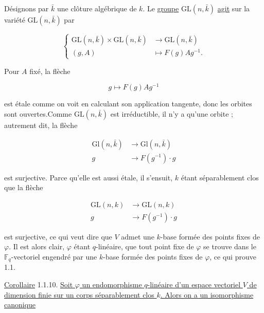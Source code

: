 Désignons par $\bar k$ une clôture algébrique de $k$. Le
\underline{groupe} $\mathrm{GL}(n,\bar k)$ \underline{agit} sur la variété
$\mathrm{GL}(n,\bar k)$ par

\begin{equation}\tag{1.1.6}
\left\{
\begin{aligned}
\mathrm{GL}(n,\bar k)\times\mathrm{GL}(n,\bar k)
&\longrightarrow\mathrm{GL}(n,\bar k)\\
(g,A)&\longmapsto F(g)Ag^{-1}.
\end{aligned}
\right.
\end{equation}

Pour $A$ fixé, la flèche

\begin{equation}\tag{1.1.7}
g\longmapsto F(g)Ag^{-1}
\end{equation}

est étale comme on voit en calculant son application tangente, donc les
orbites sont ouvertes.Comme $\mathrm{GL}(n,\bar k)$ est irréductible, il n'y
a qu'une orbite ; autrement dit, la flèche

\begin{equation}\tag{1.1.8}
\begin{aligned}
\mathrm{Gl}(n,\bar k)&\longrightarrow\mathrm{Gl}(n,\bar k)\\
g&\longrightarrow F(g^{-1})\cdot g
\end{aligned}
\end{equation}


est surjective. Parce qu'elle est aussi étale, il s'ensuit, $k$ étant
séparablement clos que la flèche

\begin{equation}\tag{1.1.9}
\begin{aligned}
\mathrm{GL}(n,k)&\longrightarrow\mathrm{GL}(n,k)\\
g&\longrightarrow F(g^{-1})\cdot g
\end{aligned}
\end{equation}

est surjective, ce qui veut dire que $V$ admet une $k$-base formée des points
fixes de $\varphi$. Il est alors clair, $\varphi$ étant $q$-linéaire, que tout
point fixe de $\varphi$ se trouve dans le $\mathbb F_q$-vectoriel engendré par
une $k$-base formée des points fixes de $\varphi$, ce qui prouve 1.1.

\underline{Corollaire} 1.1.10. \underline{Soit $\varphi$ un endomorphisme
$q$-linéaire d'un espace vectoriel $V$ de dimension finie sur un corps
séparablement clos $k$. Alors on a un isomorphisme canonique}

